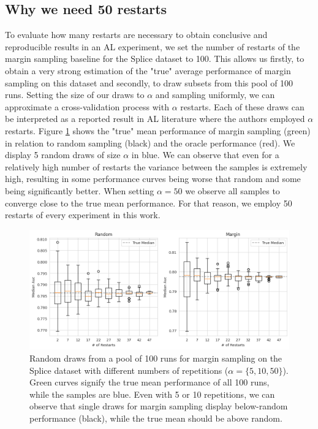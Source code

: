 \documentclass[]{article}
\begin{document}
\subsection{Why we need 50 restarts}\label{sec:restarts}
To evaluate how many restarts are necessary to obtain conclusive and reproducible results in an AL experiment, we set the number of restarts of the margin sampling baseline for the Splice dataset to 100.
This allows us firstly, to obtain a very strong estimation of the "true" average performance of margin sampling on this dataset and secondly, to draw subsets from this pool of 100 runs.
Setting the size of our draws to $\alpha$ and sampling uniformly, we can approximate a cross-validation process with $\alpha$ restarts.
Each of these draws can be interpreted as a reported result in AL literature where the authors employed $\alpha$ restarts.
Figure \ref{fig:restarts} shows the "true" mean performance of margin sampling (green) in relation to random sampling (black) and the oracle performance (red).
We display 5 random draws of size $\alpha$ in blue.
We can observe that even for a relatively high number of restarts the variance between the samples is extremely high, resulting in some performance curves being worse that random and some being significantly better.
When setting $\alpha = 50$ we observe all samples to converge close to the true mean performance. 
For that reason, we employ 50 restarts of every experiment in this work.
\begin{figure}
        \hspace{-20mm}
	\includegraphics[width=1.24\linewidth]{img/ablation_restarts}
	\caption{Random draws from a pool of 100 runs for margin sampling on the Splice dataset with different numbers of repetitions ($\alpha=\{5,10,50\}$). Green curves signify the true mean performance of all 100 runs, while the samples are blue. Even with 5 or 10 repetitions, we can observe that single draws for margin sampling display below-random performance (black), while the true mean should be above random.}
	\label{fig:restarts}
\end{figure}
\end{document}
